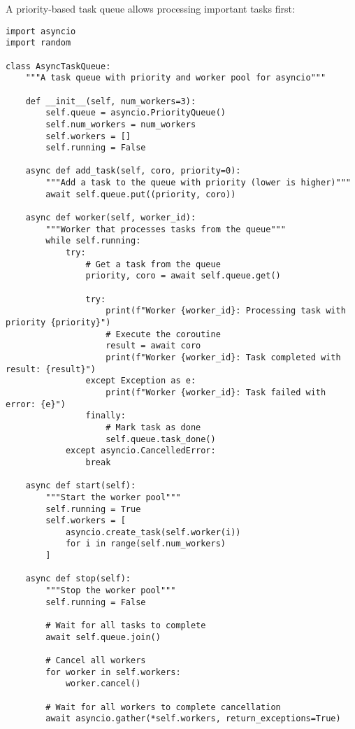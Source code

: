 \documentclass[12pt,letterpaper]{article}
\newenvironment{macterminal}{%
    \begin{mdframed}[
        linecolor=terminalFrame,
        backgroundcolor=terminalBg,
        roundcorner=5pt,
        skipabove=10pt,
        skipbelow=10pt,
        linewidth=1pt,
        innertopmargin=10pt, %
        frametitle={%
            \tikz[baseline=(current bounding box.east), outer sep=0pt]{
                \fill[red!80!black] (0,0) circle (5pt);
                \fill[yellow!80!black] (0.7,0) circle (5pt);
                \fill[green!70!black] (1.4,0) circle (5pt);
            }
        },
        frametitlealignment=\raggedright, %
        frametitleaboveskip=8pt, %
        frametitlebelowskip=0pt, %
    ]
}{%
    \end{mdframed}%
}
\begin{document}
A priority-based task queue allows processing important tasks first:

\begin{macterminal}
\begin{lstlisting}
import asyncio
import random

class AsyncTaskQueue:
    """A task queue with priority and worker pool for asyncio"""
    
    def __init__(self, num_workers=3):
        self.queue = asyncio.PriorityQueue()
        self.num_workers = num_workers
        self.workers = []
        self.running = False
    
    async def add_task(self, coro, priority=0):
        """Add a task to the queue with priority (lower is higher)"""
        await self.queue.put((priority, coro))
    
    async def worker(self, worker_id):
        """Worker that processes tasks from the queue"""
        while self.running:
            try:
                # Get a task from the queue
                priority, coro = await self.queue.get()
                
                try:
                    print(f"Worker {worker_id}: Processing task with priority {priority}")
                    # Execute the coroutine
                    result = await coro
                    print(f"Worker {worker_id}: Task completed with result: {result}")
                except Exception as e:
                    print(f"Worker {worker_id}: Task failed with error: {e}")
                finally:
                    # Mark task as done
                    self.queue.task_done()
            except asyncio.CancelledError:
                break
    
    async def start(self):
        """Start the worker pool"""
        self.running = True
        self.workers = [
            asyncio.create_task(self.worker(i))
            for i in range(self.num_workers)
        ]
    
    async def stop(self):
        """Stop the worker pool"""
        self.running = False
        
        # Wait for all tasks to complete
        await self.queue.join()
        
        # Cancel all workers
        for worker in self.workers:
            worker.cancel()
        
        # Wait for all workers to complete cancellation
        await asyncio.gather(*self.workers, return_exceptions=True)


\end{lstlisting}
\end{macterminal}
\end{document}

